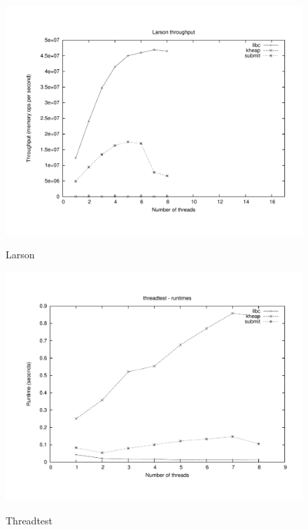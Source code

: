 \documentclass[oneside]{amsart}
\theoremstyle{definition}
\theoremstyle{remark}
\numberwithin{equation}{section}
\begin{document}
\begin{figure}[h]
    \caption{Larson}
    \centering
    \includegraphics[scale=0.33]{../benchmarks/larson/larson.pdf}
    \label{fig:plot}
\end{figure}

\begin{figure}[h]
    \caption{Threadtest}
    \centering
    \includegraphics[scale=0.33]{../benchmarks/threadtest/threadtest.pdf}
    \label{fig:plot}
\end{figure}
\end{document}
